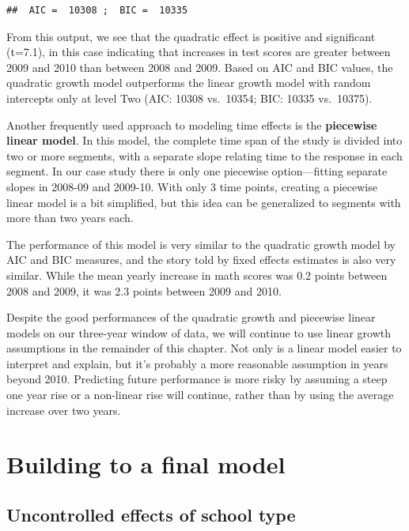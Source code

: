 \documentclass[
]{krantz}
\begin{document}
\begin{verbatim}
##  AIC =  10308 ;  BIC =  10335
\end{verbatim}

From this output, we see that the quadratic effect is positive and significant (t=7.1), in this case indicating that increases in test scores are greater between 2009 and 2010 than between 2008 and 2009. Based on AIC and BIC values, the quadratic growth model outperforms the linear growth model with random intercepts only at level Two (AIC: 10308 vs.~10354; BIC: 10335 vs.~10375).

Another frequently used approach to modeling time effects is the \textbf{piecewise linear model}. In this model, the complete time span of the study is divided into two or more segments, with a separate slope relating time to the response in each segment. In our case study there is only one piecewise option---fitting separate slopes in 2008-09 and 2009-10. With only 3 time points, creating a piecewise linear model is a bit simplified, but this idea can be generalized to segments with more than two years each.

The performance of this model is very similar to the quadratic growth model by AIC and BIC measures, and the story told by fixed effects estimates is also very similar. While the mean yearly increase in math scores was 0.2 points between 2008 and 2009, it was 2.3 points between 2009 and 2010.

Despite the good performances of the quadratic growth and piecewise linear models on our three-year window of data, we will continue to use linear growth assumptions in the remainder of this chapter. Not only is a linear model easier to interpret and explain, but it's probably a more reasonable assumption in years beyond 2010. Predicting future performance is more risky by assuming a steep one year rise or a non-linear rise will continue, rather than by using the average increase over two years.

\hypertarget{finalmodel}{%
\section{Building to a final model}\label{finalmodel}}

\hypertarget{sec:modelc9}{%
\subsection{Uncontrolled effects of school type}\label{sec:modelc9}}
\end{document}
